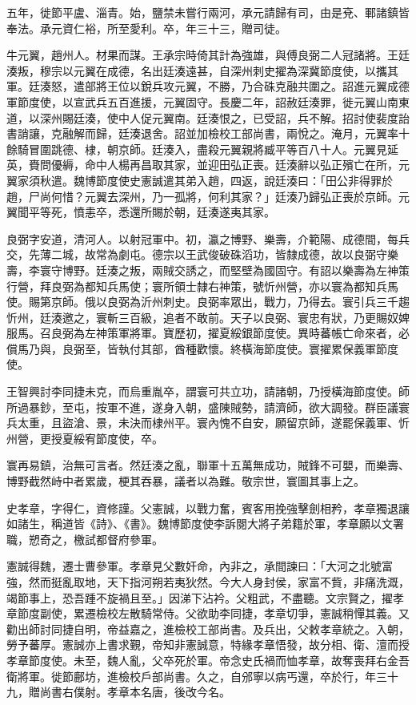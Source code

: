 \begin{pinyinscope}
 五年，徙節平盧、淄青。始，鹽禁未嘗行兩河，承元請歸有司，由是兗、鄆諸鎮皆奉法。承元資仁裕，所至愛利。卒，年三十三，贈司徒。



 牛元翼，趙州人。材果而謀。王承宗時倚其計為強雄，與傅良弼二人冠諸將。王廷湊叛，穆宗以元翼在成德，名出廷湊遠甚，自深州刺史擢為深冀節度使，以攜其軍。廷湊怒，遣部將王位以銳兵攻元翼，不勝，乃合硃克融共圍之。詔進元翼成德軍節度使，以宣武兵五百進援，元翼固守。長慶二年，詔赦廷湊罪，徙元翼山南東道，以深州賜廷湊，使中人促元翼南。廷湊恨之，已受詔，兵不解。招討使裴度詒書誚讓，克融解而歸，廷湊退舍。詔並加檢校工部尚書，兩悅之。淹月，元翼率十餘騎冒圍跳德、棣，朝京師。廷湊入，盡殺元翼親將臧平等百八十人。元翼見延英，賚問優縟，命中人楊再昌取其家，並迎田弘正喪。廷湊辭以弘正殯亡在所，元翼家須秋遣。魏博節度使史憲誠遣其弟入趙，四返，說廷湊曰：「田公非得罪於趙，尸尚何惜？元翼去深州，乃一孤將，何利其家？」廷湊乃歸弘正喪於京師。元翼聞平等死，憤恚卒，悉還所賜於朝，廷湊遂夷其家。



 良弼字安道，清河人。以射冠軍中。初，瀛之博野、樂壽，介範陽、成德間，每兵交，先薄二城，故常為劇屯。德宗以王武俊破硃滔功，皆隸成德，故以良弼守樂壽，李寰守博野。廷湊之叛，兩賊交誘之，而堅壁為國固守。有詔以樂壽為左神策行營，拜良弼為都知兵馬使；寰所領士隸右神策，號忻州營，亦以寰為都知兵馬使。賜第京師。俄以良弼為沂州刺史。良弼率眾出，戰力，乃得去。寰引兵三千趨忻州，廷湊邀之，寰斬三百級，追者不敢前。天子以良弼、寰忠有狀，乃更賜奴婢服馬。召良弼為左神策軍將軍。寶歷初，擢夏綏銀節度使。異時蕃帳亡命來者，必償馬乃與，良弼至，皆執付其部，酋種歡懷。終橫海節度使。寰擢累保義軍節度使。



 王智興討李同捷未克，而烏重胤卒，謂寰可共立功，請諸朝，乃授橫海節度使。師所過暴鈔，至屯，按軍不進，遂身入朝，盛陳賊勢，請濟師，欲大調發。群臣議寰兵太重，且盜滄、景，未決而棣州平。寰內愧不自安，願留京師，遂罷保義軍、忻州營，更授夏綏宥節度使，卒。



 寰再易鎮，治無可言者。然廷湊之亂，聯軍十五萬無成功，賊鋒不可嬰，而樂壽、博野截然峙中者累歲，梗其吞暴，議者以為難。敬宗世，寰圖其事上之。



 史孝章，字得仁，資修謹。父憲誠，以戰力奮，賓客用挽強擊劍相矜，孝章獨退讓如諸生，稱道皆《詩》、《書》。魏博節度使李訴閱大將子弟籍於軍，孝章願以文署職，愬奇之，檄試都督府參軍。



 憲誠得魏，遷士曹參軍。孝章見父數奸命，內非之，承間諫曰：「大河之北號富強，然而挺亂取地，天下指河朔若夷狄然。今大人身封侯，家富不貲，非痛洗溉，竭節事上，恐吾踵不旋禍且至。」因涕下沾衿。父粗武，不盡聽。文宗賢之，擢孝章節度副使，累遷檢校左散騎常侍。父欲助李同捷，孝章切爭，憲誠稍憚其義。又勸出師討同捷自明，帝益嘉之，進檢校工部尚書。及兵出，父敕孝章統之。入朝，勞予蕃厚。憲誠亦上書求覲，帝知非憲誠意，特緣孝章悟發，故分相、衛、澶而授孝章節度使。未至，魏人亂，父卒死於軍。帝念史氏禍而恤孝章，故奪喪拜右金吾衛將軍。徙節鄜坊，進檢校戶部尚書。久之，自邠寧以病丐還，卒於行，年三十九，贈尚書右僕射。孝章本名唐，後改今名。




\end{pinyinscope}
